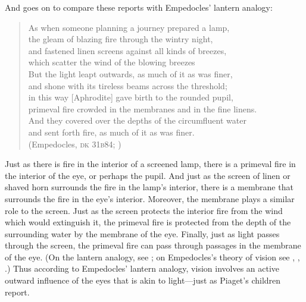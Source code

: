 And \citet[48--49]{Piaget:1929dp} goes on to compare these reports with Empedocles' lantern analogy:
\begin{verse}
	As when someone planning a journey prepared a lamp,\\
	the gleam of blazing fire through the wintry night,\\
	and fastened linen screens against all kinds of breezes,\\
	which scatter the wind of the blowing breezes\\
	But the light leapt outwards, as much of it as was finer,\\
	and shone with its tireless beams across the threshold;\\
	in this way [Aphrodite] gave birth to the rounded pupil,\\
	primeval fire crowded in the membranes and in the fine linens.\\
	And they covered over the depths of the circumfluent water\\
	and sent forth fire, as much of it as was finer.\\
	(Empedocles, \textsc{dk} 31\textsc{b}84; \citealt[103 259]{Inwood:2001ve})
\end{verse}
Just as there is fire in the interior of a screened lamp, there is a primeval fire in the interior of the eye, or perhaps the pupil. And just as the screen of linen or shaved horn surrounds the fire in the lamp's interior, there is a membrane that surrounds the fire in the eye's interior. Moreover, the membrane plays a similar role to the screen. Just as the screen protects the interior fire from the wind which would extinguish it, the primeval fire is protected from the depth of the surrounding water by the membrane of the eye. Finally, just as light passes through the screen, the primeval fire can pass through passages in the membrane of the eye. (On the lantern analogy, see \citealt[240--243]{Wright:1981zr}; on Empedocles's theory of vision see \citealt{Sedley:1992uq}, \citealt{Ierodiakonou:2005fk}, \citealt[chapter 1]{Kalderon:2015fr}.) Thus according to Empedocles' lantern analogy, vision involves an active outward influence of the eyes that is akin to light---just as Piaget's children report.

